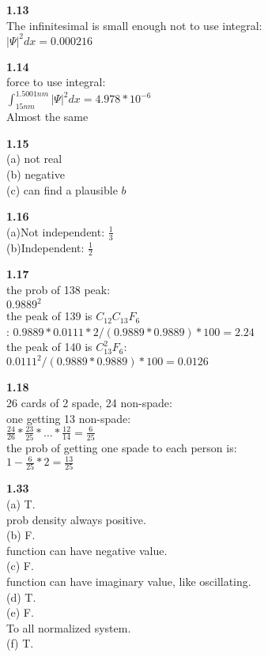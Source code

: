 \documentclass{article}
\begin{document}
\textbf{1.13}\\
The infinitesimal is small enough not to use integral:\\
$|\Psi|^2dx = 0.000216$\\
\newline

\textbf{1.14}\\
force to use integral:\\
$\int_{15nm}^{1.5001nm}|\Psi|^2dx = 4.978*10^{-6}$\\
Almost the same\\
\newline

\textbf{1.15}\\
(a) not real\\
(b) negative\\
(c) can find a plausible $b$\\
\newline

\textbf{1.16}\\
(a)Not independent: $\frac{1}{3}$\\
(b)Independent: $\frac{1}{2}$\\
\newline

\textbf{1.17}\\
the prob of 138 peak:\\
$0.9889^2$\\
the peak of 139 is $C_{12}C_{13}F_6$\\:
$0.9889*0.0111*2 / (0.9889*0.9889) * 100 = 2.24$\\
the peak of 140 is $C_{13}^2F_6$:\\
$0.0111^2 / (0.9889*0.9889)*100 = 0.0126$\\
\newline

\textbf{1.18}\\
26 cards of 2 spade, 24 non-spade:\\
one getting 13 non-spade:\\
$\frac{24}{26}*\frac{23}{25}*\dots*\frac{12}{14} = \frac{6}{25}$\\
the prob of getting one spade to each person is:\\
$1 - \frac{6}{25}*2 = \frac{13}{25}$\\
\newline

\textbf{1.33}\\
(a) T.\\
prob density always positive.\\
(b) F.\\
function can have negative value.\\
(c) F.\\
function can have imaginary value, like oscillating.\\
(d) T.\\
(e) F.\\
To all normalized system.\\
(f) T.\\
\newline
\end{document}
